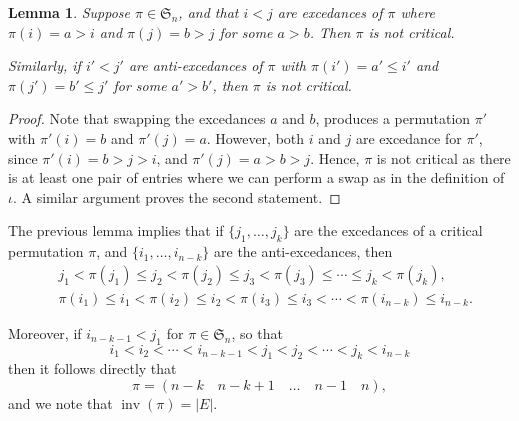 \documentclass[reqno]{amsart}
\newtheorem{lemma}[theorem]{Lemma}
\theoremstyle{definition}
\newcommand{\symS}{\mathfrak{S}}
\DeclareMathOperator{\inv}{inv}
\begin{document}
\begin{lemma}
Suppose $\pi \in \symS_n$, and that $i<j$ are excedances of $\pi$
where $\pi(i)=a>i$ and $\pi(j)=b>j$ for some $a>b$.
Then $\pi$ is not critical.

Similarly, if $i'<j'$ are anti-excedances of $\pi$
with $\pi(i')=a'\leq i'$ and $\pi(j')=b' \leq j'$ for some $a'>b'$,
then $\pi$ is not critical.
\end{lemma}
\begin{proof}
Note that swapping the excedances $a$ and $b$,
produces a permutation $\pi'$ with $\pi'(i)=b$ and $\pi'(j)=a$.
However, both $i$ and $j$ are excedance for $\pi'$, since $\pi'(i)=b>j>i$,
and $\pi'(j)=a>b>j$. Hence, $\pi$ is not critical as there is at least
one pair of entries where  we can perform a swap as in the definition of $\iota$.
A similar argument proves the second statement.
\end{proof}

The previous lemma implies that if $\{j_1,\dotsc,j_k\}$
are the excedances of a critical permutation $\pi$,
and $\{i_1,\dotsc,i_{n-k}\}$ are the anti-excedances,
then
\begin{equation}\label{eq:excSorted}
\begin{aligned}
 &j_1 < \pi(j_1) \leq j_2 < \pi(j_2) \leq j_3 < \pi(j_3) \leq \dotsb \leq j_k< \pi(j_k), \\
 &\pi(i_1) \leq i_1 < \pi(i_2) \leq i_2 < \pi(i_3) \leq i_3 <\dotsb < \pi(i_{n-k}) \leq i_{n-k}.
\end{aligned}
\end{equation}

Moreover, if $i_{n-k-1}<j_1$ for $\pi \in \symS_n$,
so that 
\[
  i_1 < i_2< \dotsb < i_{n-k-1}<j_1<j_2 < \dotsb < j_k <i_{n-k}
\]
then it follows directly that 
\begin{equation}\label{eq:specialCase}
  \pi = (n-k\quad n-k+1 \quad \dotsc \quad n-1\quad  n),
\end{equation}
and we note that $\inv(\pi)=|E|$.
\end{document}
